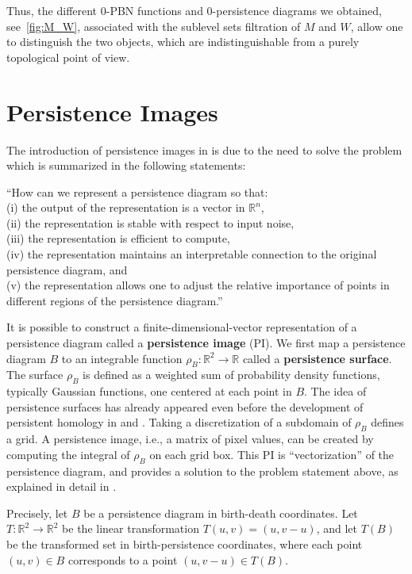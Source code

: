 \documentclass[english, LaM, oneside, noexaminfo]{sapthesis}
\begin{document}
Thus, the different $0$-PBN functions and $0$-persistence diagrams we obtained, see~\cref{fig:M_W}, associated with the sublevel sets filtration of $M$ and $W$, allow one to distinguish the two objects, which are indistinguishable from a purely topological point of view.

\section{Persistence Images}
\label{PIs}

The introduction of persistence images in \cite{adams2017persistence} is due to the need to solve the problem which is summarized in the following statements:

``How can we represent a persistence diagram so that: \\
(i) the output of the representation is a vector in $\mathbb{R}^n$, \\
(ii) the representation is stable with respect to input noise, \\
(iii) the representation is efficient to compute, \\
(iv) the representation maintains an interpretable connection to the original persistence diagram, and \\
(v) the representation allows one to adjust the relative importance of points in different
regions of the persistence diagram.''

It is possible to construct a finite-dimensional-vector representation of a persistence diagram called a {\bf persistence image} (PI). We first map a persistence diagram $B$ to an integrable function $\rho_B: \mathbb{R}^2 \rightarrow \mathbb{R}$ called a {\bf persistence surface}. The surface $\rho_B$ is defined as a weighted sum of probability density functions, typically Gaussian functions, one centered at each point in $B$.  The idea of persistence surfaces has already appeared even  before the development of persistent homology in \cite{ferri1998point} and \cite{donatini1998size}. Taking a discretization of a subdomain of $\rho_B$ defines a grid. A persistence image, i.e., a matrix of pixel values, can be created by computing the integral of $\rho_B$ on each grid box. This PI is ``vectorization'' of the persistence diagram, and provides a solution to the problem statement above, as explained in detail in \cite{adams2017persistence}.

Precisely, let $B$ be a persistence diagram in birth-death coordinates.  Let $T : \mathbb{R}^2 \rightarrow \mathbb{R}^2$ be the linear transformation $T(u, v) = (u, v - u)$, and let $T(B)$ be the transformed set in birth-persistence coordinates, where each point $(u, v) \in B$ corresponds to a point $(u, v - u) \in T(B)$.
\end{document}
